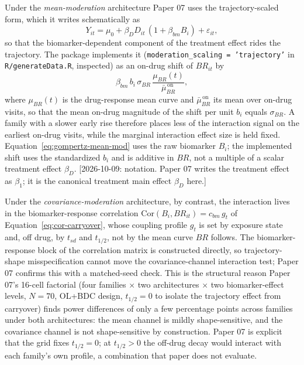 \documentclass[11pt]{article}
\newcommand{\note}[1]{\textcolor{blue!60!black}{\small [#1]}}
\newcommand{\code}[1]{\texttt{#1}}
\begin{document}
Under the \emph{mean-moderation} architecture Paper 07 uses the
trajectory-scaled form, which it writes schematically as
\begin{equation}
Y_{it} = \mu_0 + \beta_D D_{it}\,(1 + \beta_{bm} B_i) + \varepsilon_{it},
\label{eq:gompertz-mean-mod}
\end{equation}
so that the biomarker-dependent component of the treatment effect
rides the trajectory. The package implements it
(\code{moderation\_scaling = 'trajectory'} in \code{R/generateData.R},
inspected) as an on-drug shift of $BR_{it}$ by
\begin{equation}
\beta_{bm}\, b_i\, \sigma_{BR}\, \frac{\mu_{BR}(t)}{\bar\mu_{BR}^{\,\mathrm{on}}},
\label{eq:gompertz-mean-mod-code}
\end{equation}
where $\mu_{BR}(t)$ is the drug-response mean curve and
$\bar\mu_{BR}^{\,\mathrm{on}}$ its mean over on-drug visits, so that
the mean on-drug magnitude of the shift per unit $b_i$ equals
$\sigma_{BR}$. A family with a slower early rise therefore places less
of the interaction signal on the earliest on-drug visits, while the
marginal interaction effect size is held fixed.
Equation~\eqref{eq:gompertz-mean-mod} uses the raw biomarker $B_i$;
the implemented shift uses the standardized $b_i$ and is additive in
$BR$, not a multiple of a scalar treatment effect $\beta_D$.
\note{2026-10-09: notation. Paper 07 writes the treatment effect as
$\beta_1$; it is the canonical treatment main effect $\beta_D$ here.}

Under the \emph{covariance-moderation} architecture, by contrast, the
interaction lives in the biomarker-response correlation
$\mathrm{Cor}(B_i, BR_{it}) = c_{bm}\, g_t$ of
Equation~\eqref{eq:cor-carryover}, whose coupling profile
$g_t$ is set by exposure state and, off drug,
by $t_{sd}$ and $t_{1/2}$, not by the mean curve $BR$ follows. The
biomarker-response block of the correlation matrix is constructed
directly, so trajectory-shape misspecification cannot move the
covariance-channel interaction test; Paper 07 confirms this with a
matched-seed check. This is the structural reason Paper 07's 16-cell
factorial (four families $\times$ two architectures $\times$ two
biomarker-effect levels, $N=70$, OL+BDC design, $t_{1/2}=0$ to isolate
the trajectory effect from carryover) finds power differences of only
a few percentage points across families under both architectures: the
mean channel is mildly shape-sensitive, and the covariance channel is
not shape-sensitive by construction. Paper 07 is explicit that the
grid fixes $t_{1/2}=0$; at $t_{1/2}>0$ the off-drug decay would
interact with each family's own profile, a combination that paper
does not evaluate.
\end{document}
